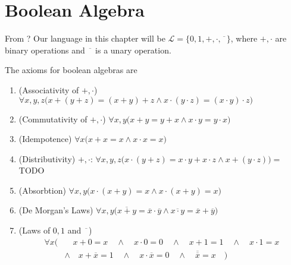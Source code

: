 \chapter{Boolean Algebra}
From \cite{krivine1998théorie}?
Our language in this chapter will be $\mathcal{L} = \{0,1,+,\cdot,\overline{\phantom{x}}\}$, where $+,\cdot$ are binary operations and $\overline{\phantom{x}}$ is a unary operation.
 
The axioms for boolean algebras are 
\begin{enumerate}
    \item (Associativity of $+,\cdot$) $\forall x,y,z \bigl(x+(y+z) = (x+y)+z \land x\cdot (y\cdot z) = (x \cdot y ) \cdot z\bigr)$
    \item (Commutativity of $+,\cdot$) $\forall x,y \bigl(x+y=y+x \land x\cdot y = y\cdot x\bigr)$
    \item (Idempotence) $\forall x \bigl(x+x = x \land x\cdot x = x\bigr)$
    \item (Distributivity) $+,\cdot$: $\forall x,y,z \bigl(x\cdot (y+z) = x\cdot y + x\cdot z \land x+(y\cdot z)\bigr) = $TODO
    \item (Absorbtion) $\forall x,y \bigl(x\cdot (x+ y) = x  \land x\cdot (x+y) = x\bigr)$
    \item (De Morgan's Laws) $\forall x,y \bigl(\overline{x+y} = \overline{x}\cdot \overline{y}\land \overline{x\cdot y} = \overline{x}+ \overline{y}\bigr)$
    \item (Laws of $0,1$ and $\overline{\phantom{x}}$) $$\begin{aligned}
        \forall x \bigl(&\quad x+0 = x \quad\land\quad x\cdot 0 = 0 \quad\land\quad x+1 = 1\quad\land\quad x\cdot 1 = x \\
        &\land\quad x + \overline{x} = 1 \quad\land\quad x\cdot \overline{x} = 0 \quad\land\quad \overline{\overline{ x}} = x\quad\bigr)
    \end{aligned}$$
\end{enumerate}
